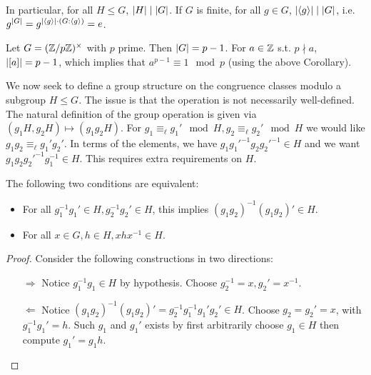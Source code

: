 \documentclass{article}
\begin{document}
\begin{corollary}
    In particular, for all $H \leq G$, $\left|H\right| \mid \left|G\right|$. If $G$ is finite, for all $g \in G$, $\left|\left\langle g \right\rangle\right| \mid \left|G\right|$, i.e. $g^{\left|G\right|} = g^{\left|\left\langle g \right\rangle\right| \cdot (G : \left\langle g \right\rangle)} = e$.
\end{corollary}

\begin{example}
    Let $G = (\mathbb{Z}/p\mathbb{Z})^{\times}$ with $p$ prime. Then $\left|G\right| = p - 1$. For $a \in \mathbb{Z}$ s.t. $p \nmid a$, $\left|[a]\right| = p-1$, which implies that $a^{p-1} \equiv 1 \mod p$ (using the above Corollary). 
\end{example}

\textstart
We now seek to define a group structure on the congruence classes modulo a subgroup $H \leq G$. The issue is that the operation is not necessarily well-defined. The natural definition of the group operation is given via $(g_1 H, g_2 H) \mapsto (g_1 g_2 H)$. For $g_1 \equiv_{\ell} g_1' \mod H, g_2 \equiv_{\ell} g_2' \mod H$ we would like $g_1 g_2 \equiv_{\ell} g_1' g_2'$. In terms of the elements, we have $g_1 g_1'^{-1} g_2 g_2'^{-1} \in H$ and we want $g_1 g_2 g_2'^{-1} g_1^{-1} \in H$. This requires extra requirements on $H$.

\begin{claim}\label{clm: constraint on group to have operations on cong classes}
    The following two conditions are equivalent:
    \begin{itemize}
        \item For all $g_1^{-1}g_1' \in H, g_2^{-1}g_2' \in H$, this implies $(g_1 g_2)^{-1}(g_1 g_2)' \in H$.
        \item For all $x \in G, h \in H, xhx^{-1} \in H$.
    \end{itemize}
\end{claim}

\begin{proof}
    Consider the following constructions in two directions:
    \begin{itemize}
        \item[$\Rightarrow$] Notice $g_1^{-1} g_1 \in H$ by hypothesis. Choose $g_2^{-1} = x, g_2' = x^{-1}$.
        \item[$\Leftarrow$] Notice $(g_1 g_2)^{-1}(g_1 g_2)' = g_2^{-1} g_1^{-1} g_1' g_2' \in H$. Choose $g_2 = g_2' = x$, with $g_1^{-1} g_1' = h$. Such $g_1$ and $g_1'$ exists by first arbitrarily choose $g_1 \in H$ then compute $g_1' = g_1 h$.
    \end{itemize}
\end{proof}
\end{document}
